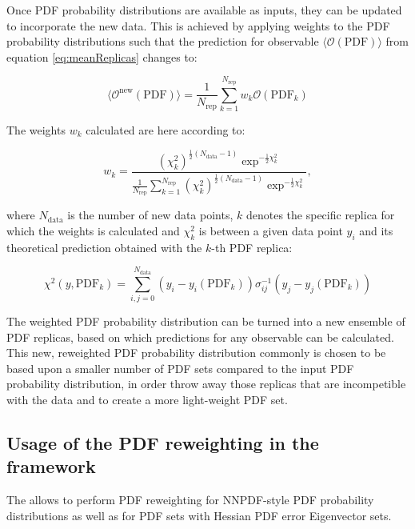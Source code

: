 Once PDF probability distributions are available as inputs, they can be updated to incorporate the new data. This is achieved by applying weights to the PDF probability distributions such that the prediction for observable $\langle\mathcal{O}(\mathrm{PDF})\rangle$ from equation \ref{eq:meanReplicas} changes to:

\begin{equation}
 \langle\mathcal{O}^{\mathrm{new}}(\mathrm{PDF})\rangle = \frac{1}{N_{\mathrm{rep}}} \sum_{k=1}^{N_{\mathrm{rep}}} w_k \mathcal{O}(\mathrm{PDF}_k)
\end{equation}

The weights $w_k$ calculated are here according to:

\begin{equation}
 w_k = \frac{(\chi^2_k)^{\frac{1}{2} (N_{\mathrm{data}}-1) } \exp^{-\frac{1}{2}\chi^2_k}}{ \frac{1}{N_{\mathrm{rep}}} \sum^{N_{\mathrm{rep}}}_{k=1}(\chi^2_k)^{\frac{1}{2}(N_{\mathrm{data}}-1)} \exp^{-\frac{1}{2}\chi^2_k}  },
\end{equation}

where $N_{\mathrm{data}}$ is the number of new data points, $k$ denotes the specific replica for which the weights is calculated and $\chi^2_k$ is between a given data point $y_i$ and its theoretical prediction obtained with the $k$-th PDF replica:

\begin{equation}
 \chi^2 (y,\mathrm{PDF}_k) = \sum_{i,j=0}^{N_{\mathrm{data}}} (y_i - y_i(\mathrm{PDF}_k)) \sigma^{-1}_{ij} (y_j-y_j(\mathrm{PDF}_k))  
\end{equation}

The weighted PDF probability distribution can be turned into a new ensemble of PDF replicas, based on which predictions for any observable can be calculated. This new, reweighted PDF probability distribution commonly is chosen to be based upon a smaller number of PDF sets compared to the input PDF probability distribution, in order throw away those replicas that are incompetible with the data and to create a more light-weight PDF set. 


\subsection{Usage of the PDF reweighting in the \fitter framework}
 
The \fitter allows to perform PDF reweighting for NNPDF-style PDF probability distributions as well as for PDF sets with Hessian PDF error Eigenvector sets. 


